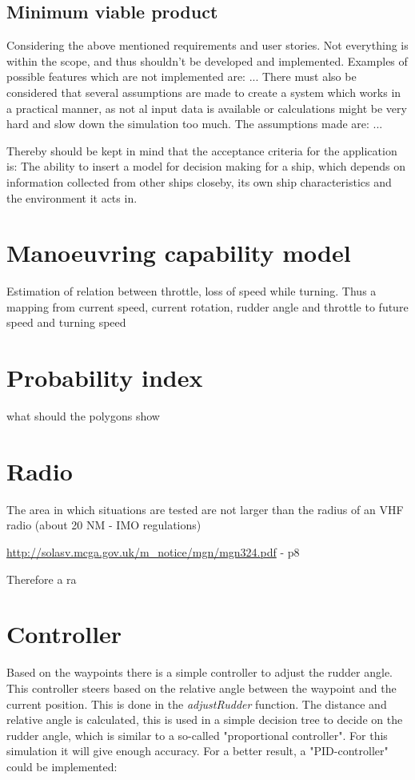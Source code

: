 \subsection{Minimum viable product}
Considering the above mentioned requirements and user stories. Not everything is within the scope, and thus shouldn't be developed and implemented. Examples of possible features which are not implemented are: ... 
There must also be considered that several assumptions are made to create a system which works in a practical manner, as not al input data is available or calculations might be very hard and slow down the simulation too much. The assumptions made are: ...

Thereby should be kept in mind that the acceptance criteria for the application is: The ability to insert a model for decision making for a ship, which depends on information collected from other ships closeby, its own ship characteristics and the environment it acts in.

\section{Manoeuvring capability model}
Estimation of relation between throttle, loss of speed while turning. Thus a mapping from current speed, current rotation, rudder angle and throttle to future speed and turning speed

\section{Probability index}
what should the polygons show

\section{Radio}
The area in which situations are tested are not larger than the radius of an VHF radio (about 20 NM - IMO regulations)

\url{http://solasv.mcga.gov.uk/m_notice/mgn/mgn324.pdf} - p8

Therefore a ra

\section{Controller}
Based on the waypoints there is a simple controller to adjust the rudder angle. This controller steers based on the relative angle between the waypoint and the current position. This is done in the \emph{adjustRudder} function. The distance and relative angle is calculated, this is used in a simple decision tree to decide on the rudder angle, which is similar to a so-called "proportional controller". For this simulation it will give enough accuracy. For a better result, a "PID-controller" could be implemented:

